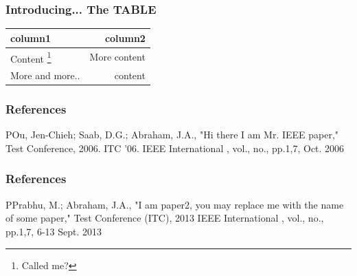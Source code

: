 \documentclass[17pt]{beamer}
\begin{document}
\begin{frame}
\frametitle{Introducing... The TABLE}
\begin{center}
  \begin{tabular}{ | l | r | }
    \hline
    column1 & column2\\ \hline
    Content \footnote{Called me?} & More content \\ \hline 
    More and more.. & content   \\
    \hline
  \end{tabular}
\end{center}
\end{frame}

\begin{frame}
\frametitle{References}
\begin{thebibliography}{1} %
\bibitem POu, Jen-Chieh; Saab, D.G.; Abraham, J.A., "Hi there I am Mr. IEEE paper," Test Conference, 2006. ITC '06. IEEE International , vol., no., pp.1,7, Oct. 2006
\end{thebibliography}
\end{frame}

\begin{frame}
\frametitle{References}
\begin{thebibliography}{1} %
\bibitem PPrabhu, M.; Abraham, J.A., "I am paper2, you may replace me with the name of some paper," Test Conference (ITC), 2013 IEEE International , vol., no., pp.1,7, 6-13 Sept. 2013
\end{thebibliography}
\end{frame}
\end{document}
